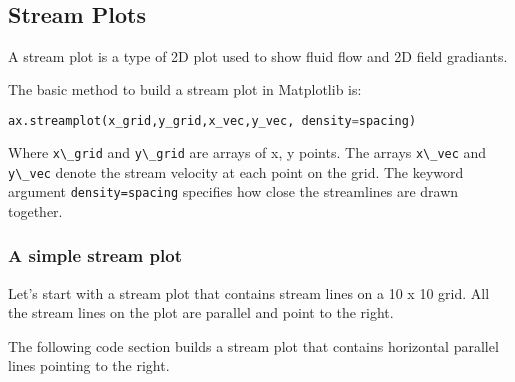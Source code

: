 \documentclass{book}
\newcommand{\passthrough}[1]{#1}
\begin{document}
    \begin{center}
    \end{center}
    { \hspace*{\fill} \\}
    

    
        \hypertarget{stream-plots}{%
\subsection{Stream Plots}\label{stream-plots}}
    




    
        A stream plot is a type of 2D plot used to show fluid flow and 2D field
gradiants.

The basic method to build a stream plot in Matplotlib is:

\begin{lstlisting}[language=Python]
ax.streamplot(x_grid,y_grid,x_vec,y_vec, density=spacing)
\end{lstlisting}

Where \passthrough{\lstinline!x\_grid!} and
\passthrough{\lstinline!y\_grid!} are arrays of x, y points. The arrays
\passthrough{\lstinline!x\_vec!} and \passthrough{\lstinline!y\_vec!}
denote the stream velocity at each point on the grid. The keyword
argument \passthrough{\lstinline!density=spacing!} specifies how close
the streamlines are drawn together.
    




    
        \hypertarget{a-simple-stream-plot}{%
\subsubsection{A simple stream plot}\label{a-simple-stream-plot}}

Let's start with a stream plot that contains stream lines on a 10 x 10
grid. All the stream lines on the plot are parallel and point to the
right.

The following code section builds a stream plot that contains horizontal
parallel lines pointing to the right.
    
\end{document}
